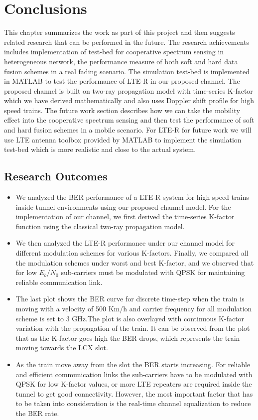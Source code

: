 \chapter{Conclusions}
\label{conclusion}
This chapter summarizes the work as part of this project and then suggests related research that can be performed in the future. The research achievements includes implementation of test-bed for cooperative spectrum sensing in heterogeneous network, the performance measure of both soft and hard data fusion schemes in a real fading scenario. The simulation test-bed is implemented in MATLAB to test the performance of LTE-R in our proposed channel. The proposed channel is built on two-ray propagation model with time-series K-factor which we have derived mathematically and also uses Doppler shift profile for high speed trains. The future work section describes how we can take the mobility effect into the cooperative spectrum sensing and then test the performance of soft and hard fusion schemes in a mobile scenario. For LTE-R for future work we will use LTE antenna toolbox provided by MATLAB to implement the simulation test-bed which is more realistic and close to the actual system.

\section{Research Outcomes}
\begin{itemize}
\item We analyzed the BER performance of a LTE-R system for high speed trains inside tunnel environments using our proposed channel model. For the implementation of our channel, we first derived the time-series K-factor function using the classical two-ray propagation model.

\item We then analyzed the LTE-R performance under our channel model for different modulation schemes for various K-factors. Finally, we compared all the modulation schemes under worst
and best K-factor, and we observed that for low $E_b/N_0$ sub-carriers must be modulated with QPSK for maintaining reliable communication link.

\item The last plot shows the BER curve for discrete time-step when the train is moving with a velocity of 500 Km/h and carrier frequency for all modulation scheme is set to 3 GHz.The plot is also overlayed with continuous K-factor variation with the propagation of the train. It can be observed from the plot that as the K-factor goes high the BER drops, which represents the train moving towards the LCX slot. 

\item As the train move away from the slot the BER starts increasing. For reliable and efficient communication links the sub-carriers have to be modulated with QPSK for low K-factor values, or more LTE repeaters are required inside the tunnel to get good connectivity. However, the most important factor that has to be taken into consideration is the real-time channel equalization to reduce the BER rate.

\end{itemize}

